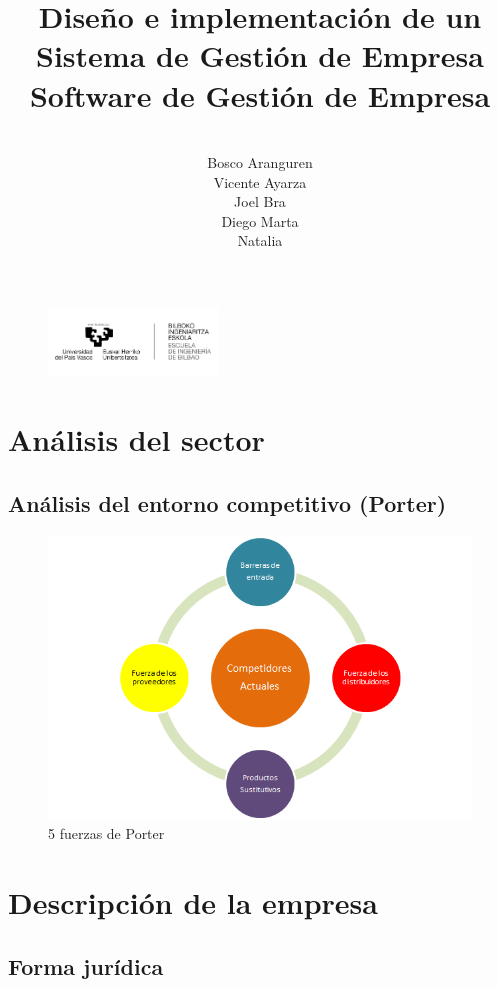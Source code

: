 \documentclass[12pt, letterpaper]{article}
\title{\textsf{\textbf{\Huge Diseño e implementación de un Sistema de Gestión de Empresa}\\ \large \textbf{Software de Gestión de Empresa}}}
\author{\vspace{70px} \\\textsf{Bosco Aranguren} \\ \textsf{Vicente Ayarza} \\ \textsf{Joel Bra} \\ \textsf{Diego Marta} \\ \textsf{Natalia }}
\date{\textsf{\vspace{40px} }}
\begin{document}
\maketitle
{}

\begin{figure}[b]
\centering
\includegraphics[width=170px]{logo.png}
\end{figure}

\sffamily
\thispagestyle{empty}
\clearpage
\tableofcontents
\clearpage
\section{\textsf{Análisis del sector}}

\subsection{\textsf{Análisis del entorno competitivo (Porter)}}
\begin{figure}[ht]
    \includegraphics[width=\textwidth]{porter.png}
    \caption{\textsf{5 fuerzas de Porter}}
    \label{Porter}
\end{figure}

\section{\textsf{Descripción de la empresa}}
\subsection{\textsf{Forma jurídica}}

\end{document}
